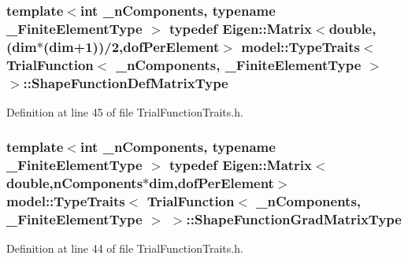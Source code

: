 \subsubsection[{Shape\+Function\+Def\+Matrix\+Type}]{\setlength{\rightskip}{0pt plus 5cm}template$<$int \+\_\+n\+Components, typename \+\_\+\+Finite\+Element\+Type $>$ typedef Eigen\+::\+Matrix$<$double,({\bf dim}$\ast$({\bf dim}+1))/2,{\bf dof\+Per\+Element}$>$ {\bf model\+::\+Type\+Traits}$<$ {\bf Trial\+Function}$<$ \+\_\+n\+Components, \+\_\+\+Finite\+Element\+Type $>$ $>$\+::{\bf Shape\+Function\+Def\+Matrix\+Type}}\label{structmodel_1_1_type_traits_3_01_trial_function_3_01__n_components_00_01___finite_element_type_01_4_01_4_a785ffa59903e476a8bc25da5e84ede33}


Definition at line 45 of file Trial\+Function\+Traits.\+h.

\hypertarget{structmodel_1_1_type_traits_3_01_trial_function_3_01__n_components_00_01___finite_element_type_01_4_01_4_a127adf899a7a30b0ef012a1b003a3f2d}{}
\subsubsection[{Shape\+Function\+Grad\+Matrix\+Type}]{\setlength{\rightskip}{0pt plus 5cm}template$<$int \+\_\+n\+Components, typename \+\_\+\+Finite\+Element\+Type $>$ typedef Eigen\+::\+Matrix$<$double,{\bf n\+Components}$\ast${\bf dim},{\bf dof\+Per\+Element}$>$ {\bf model\+::\+Type\+Traits}$<$ {\bf Trial\+Function}$<$ \+\_\+n\+Components, \+\_\+\+Finite\+Element\+Type $>$ $>$\+::{\bf Shape\+Function\+Grad\+Matrix\+Type}}\label{structmodel_1_1_type_traits_3_01_trial_function_3_01__n_components_00_01___finite_element_type_01_4_01_4_a127adf899a7a30b0ef012a1b003a3f2d}


Definition at line 44 of file Trial\+Function\+Traits.\+h.

\hypertarget{structmodel_1_1_type_traits_3_01_trial_function_3_01__n_components_00_01___finite_element_type_01_4_01_4_afc8be749eb30a3f28ce8cca5c90d3c10}{}
